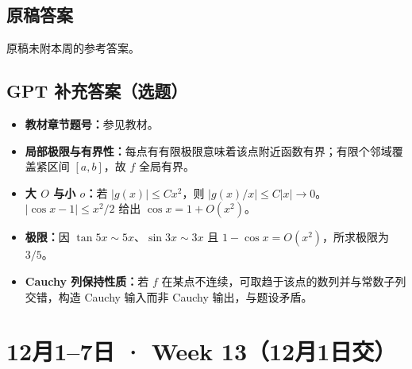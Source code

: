 \documentclass[UTF8,11pt, a4paper, oneside, fontset=none]{ctexbook}
\begin{document}
\subsection*{原稿答案}
\noindent 原稿未附本周的参考答案。
\clearpage
\subsection*{GPT 补充答案（选题）}
\begin{itemize}
\item \textbf{教材章节题号：}参见教材。
\item \textbf{局部极限与有界性：}每点有有限极限意味着该点附近函数有界；有限个邻域覆盖紧区间 $[a,b]$，故 $f$ 全局有界。
\item \textbf{大 $O$ 与小 $o$：}若 $|g(x)|\le Cx^2$，则 $|g(x)/x|\le C|x|\to0$。$|\cos x-1|\le x^2/2$ 给出 $\cos x=1+O(x^2)$。
\item \textbf{极限：}因 $\tan5x\sim5x$、$\sin3x\sim3x$ 且 $1-\cos x=O(x^2)$，所求极限为 $3/5$。
\item \textbf{Cauchy 列保持性质：}若 $f$ 在某点不连续，可取趋于该点的数列并与常数子列交错，构造 Cauchy 输入而非 Cauchy 输出，与题设矛盾。
\end{itemize}
\clearpage
\section{12月1--7日 · Week 13（12月1日交）}
\end{document}
